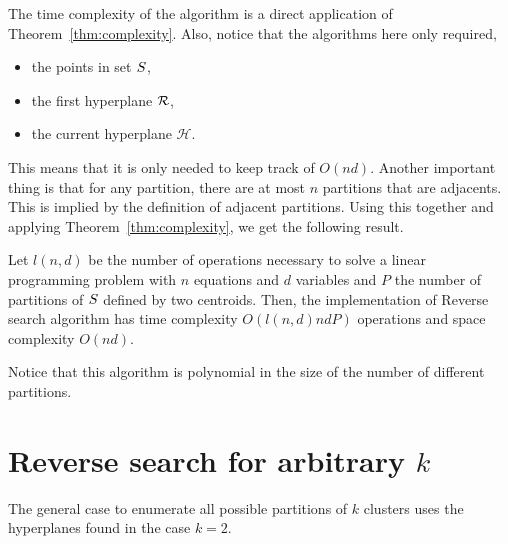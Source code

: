 \documentclass{article}
\newcommand{\cH}{\mathcal{H}}
\begin{document}
The time complexity of the algorithm is a direct application of
Theorem~\ref{thm:complexity}. Also, notice that the algorithms here
only required,
\begin{itemize}
\item the points in set $S$,
\item the first hyperplane $\mathcal{R}$,
\item the current hyperplane $\cH$.
\end{itemize}
This means that it is only needed to keep track of $O(nd)$. Another
important thing is that for any partition, there are at most $n$
partitions that are adjacents. This is implied by the definition of
adjacent partitions. Using this together and applying
Theorem~\ref{thm:complexity}, we get the following result.
\begin{theorem}
  Let $l(n,d)$ be the number of operations necessary to solve a linear
  programming problem with $n$ equations and $d$ variables and $P$ the
  number of partitions of $S$ defined by two centroids. Then, 
  the implementation of Reverse search algorithm has time complexity 
  $O( l(n,d) n d P)$ operations  and space complexity $O(n d)$.
\end{theorem}
Notice that this algorithm is polynomial in the size of the number of
different partitions. 
\section{Reverse search for arbitrary $k$}
The general case to enumerate all possible partitions of $k$ clusters
uses the hyperplanes found  in the case $k=2$. 
\end{document}
